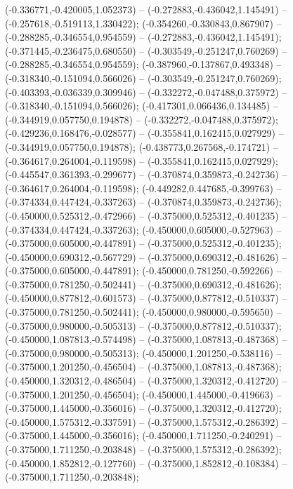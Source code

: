  (-0.336771,-0.420005,1.052373) -- (-0.272883,-0.436042,1.145491) -- (-0.257618,-0.519113,1.330422);
 (-0.354260,-0.330843,0.867907) -- (-0.288285,-0.346554,0.954559) -- (-0.272883,-0.436042,1.145491);
 (-0.371445,-0.236475,0.680550) -- (-0.303549,-0.251247,0.760269) -- (-0.288285,-0.346554,0.954559);
 (-0.387960,-0.137867,0.493348) -- (-0.318340,-0.151094,0.566026) -- (-0.303549,-0.251247,0.760269);
 (-0.403393,-0.036339,0.309946) -- (-0.332272,-0.047488,0.375972) -- (-0.318340,-0.151094,0.566026);
 (-0.417301,0.066436,0.134485) -- (-0.344919,0.057750,0.194878) -- (-0.332272,-0.047488,0.375972);
 (-0.429236,0.168476,-0.028577) -- (-0.355841,0.162415,0.027929) -- (-0.344919,0.057750,0.194878);
 (-0.438773,0.267568,-0.174721) -- (-0.364617,0.264004,-0.119598) -- (-0.355841,0.162415,0.027929);
 (-0.445547,0.361393,-0.299677) -- (-0.370874,0.359873,-0.242736) -- (-0.364617,0.264004,-0.119598);
 (-0.449282,0.447685,-0.399763) -- (-0.374334,0.447424,-0.337263) -- (-0.370874,0.359873,-0.242736);
 (-0.450000,0.525312,-0.472966) -- (-0.375000,0.525312,-0.401235) -- (-0.374334,0.447424,-0.337263);
 (-0.450000,0.605000,-0.527963) -- (-0.375000,0.605000,-0.447891) -- (-0.375000,0.525312,-0.401235);
 (-0.450000,0.690312,-0.567729) -- (-0.375000,0.690312,-0.481626) -- (-0.375000,0.605000,-0.447891);
 (-0.450000,0.781250,-0.592266) -- (-0.375000,0.781250,-0.502441) -- (-0.375000,0.690312,-0.481626);
 (-0.450000,0.877812,-0.601573) -- (-0.375000,0.877812,-0.510337) -- (-0.375000,0.781250,-0.502441);
 (-0.450000,0.980000,-0.595650) -- (-0.375000,0.980000,-0.505313) -- (-0.375000,0.877812,-0.510337);
 (-0.450000,1.087813,-0.574498) -- (-0.375000,1.087813,-0.487368) -- (-0.375000,0.980000,-0.505313);
 (-0.450000,1.201250,-0.538116) -- (-0.375000,1.201250,-0.456504) -- (-0.375000,1.087813,-0.487368);
 (-0.450000,1.320312,-0.486504) -- (-0.375000,1.320312,-0.412720) -- (-0.375000,1.201250,-0.456504);
 (-0.450000,1.445000,-0.419663) -- (-0.375000,1.445000,-0.356016) -- (-0.375000,1.320312,-0.412720);
 (-0.450000,1.575312,-0.337591) -- (-0.375000,1.575312,-0.286392) -- (-0.375000,1.445000,-0.356016);
 (-0.450000,1.711250,-0.240291) -- (-0.375000,1.711250,-0.203848) -- (-0.375000,1.575312,-0.286392);
 (-0.450000,1.852812,-0.127760) -- (-0.375000,1.852812,-0.108384) -- (-0.375000,1.711250,-0.203848);

